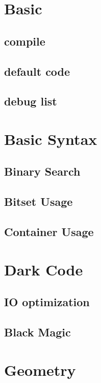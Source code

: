 \section{Basic}

\subsection{compile}

\subsection{default code}

\subsection{debug list}


\section{Basic Syntax}
\subsection{Binary Search}

\subsection{Bitset Usage}

\subsection{Container Usage}



\section{Dark Code}

\subsection{IO optimization}

\subsection{Black Magic}


\section{Geometry}

